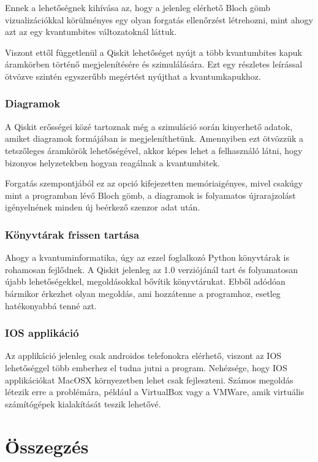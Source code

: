 \documentclass[
]{thesis-ekf}
\theoremstyle{definition}
\theoremstyle{remark}
\begin{document}
Ennek a lehetőségnek kihívása az, hogy a jelenleg elérhető Bloch gömb vizualizációkkal körülményes egy olyan forgatás ellenőrzést létrehozni, mint ahogy azt az egy kvantumbites változatoknál láttuk.

Viszont ettől függetlenül a Qiskit lehetőséget nyújt a több kvantumbites kapuk áramkörben történő megjelenítésére és szimulálására. Ezt egy részletes leírással ötvözve szintén egyszerűbb megértést nyújthat a kvantumkapukhoz.

\subsection{Diagramok}
A Qiskit erősségei közé tartoznak még a szimuláció során kinyerhető adatok, amiket diagramok formájában is megjeleníthetünk. Amennyiben ezt ötvözzük a tetszőleges áramkörök lehetőségével, akkor képes lehet a felhasználó látni, hogy bizonyos helyzetekben hogyan reagálnak a kvantumbitek.

Forgatás szempontjából ez az opció kifejezetten memóriaigényes, mivel csakúgy mint a programban lévő Bloch gömb, a diagramok is folyamatos újrarajzolást igényelnének minden új beérkező szenzor adat után.

\subsection{Könyvtárak frissen tartása}
Ahogy a kvantuminformatika, úgy az ezzel foglalkozó Python könyvtárak is rohamosan fejlődnek. A Qiskit jelenleg az 1.0 verziójánál tart és folyamatosan újabb lehetőségekkel, megoldásokkal bővítik könyvtárukat. Ebből adódóan bármikor érkezhet olyan megoldás, ami hozzátenne a programhoz, esetleg hatékonyabbá tenné azt.

\subsection{IOS applikáció}
Az applikáció jelenleg csak androidos telefonokra elérhető, viszont az IOS lehetőséggel több emberhez el tudna jutni a program. Nehézsége, hogy IOS applikációkat MacOSX környezetben lehet csak fejleszteni. Számos megoldás létezik erre a problémára, például a VirtualBox vagy a VMWare, amik virtuális számítógépek kialakítását teszik lehetővé.

\chapter*{Összegzés}


\begin{thebibliography}{2}
\end{thebibliography}


\end{document}
